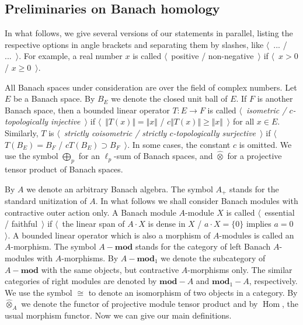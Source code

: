 \documentclass{article}
\theoremstyle{plain}
\theoremstyle{definition}
\newcommand{\projtens}{\mathbin{\widehat{\otimes}}}
\newcommand{\isom}{\mathop{\mathbin{\cong}}}
\begin{document}
\begin{fulltext}

\section{Preliminaries on Banach homology}
\label{SectionPreliminariesOnBanachHomology} 

In what follows, we give several versions of our statements in parallel, listing 
the respective options in angle brackets and separating them by slashes, 
like $\langle$~... / ...~$\rangle$. For example, a real number $x$ is called 
$\langle$~positive / non-negative~$\rangle$ if $\langle$~$x>0$ / $x\geq 0$~$\rangle$.

All Banach spaces under consideration are over the field of complex numbers. 
Let $E$ be a Banach space. By $B_E$ we denote the closed unit ball of $E$. 
If $F$ is another Banach space, then a bounded linear operator $T:E\to F$ is 
called \emph{$\langle$~isometric / $c$-topologically injective~$\rangle$} if 
$\langle$~$\Vert T(x)\Vert=\Vert x\Vert$ / $c\Vert T(x)\Vert\geq\Vert x\Vert$~$\rangle$ 
for all $x\in E$. Similarly, $T$ is \emph{$\langle$~strictly coisometric / strictly 
$c$-topologically surjective~$\rangle$} if $\langle$~$T(B_E)=B_F$ / 
$c T(B_E)\supset B_F$~$\rangle$. In some cases, the constant $c$ is omitted. We 
use the symbol $\bigoplus_p$ for an $\ell_p$-sum of Banach spaces, and $\projtens$ 
for a projective tensor product of Banach spaces. 

By $A$ we denote an arbitrary Banach algebra. The symbol $A_+$ stands for the 
standard unitization of $A$. In what follows we shall consider Banach modules 
with contractive outer action only. A Banach module $A$-module $X$ is called 
$\langle$~essential / faithful~$\rangle$ if $\langle$~the linear span of 
$A\cdot X$ is dense in $X$ / $a\cdot X=\{0\}$ implies $a=0$~$\rangle$.
A bounded linear operator which is also a morphism of $A$-modules is called an 
$A$-morphism. The symbol $A-\mathbf{mod}$ stands for the category of left 
Banach $A$-modules with $A$-morphisms. By $A-\mathbf{mod}_1$ 
we denote the subcategory of $A-\mathbf{mod}$ with the same objects, but 
contractive $A$-morphisms only. The similar categories of right modules 
are denoted by $\mathbf{mod}-A$ and $\mathbf{mod}_1-A$, respectively. We 
use the symbol $\isom$ to denote an isomorphism of two objects in a category. 
By $\projtens_A$ we denote the functor of projective module tensor product and 
by $\operatorname{Hom}$, the usual morphism functor. Now we can give our main 
definitions.


\end{fulltext}
\end{document}
